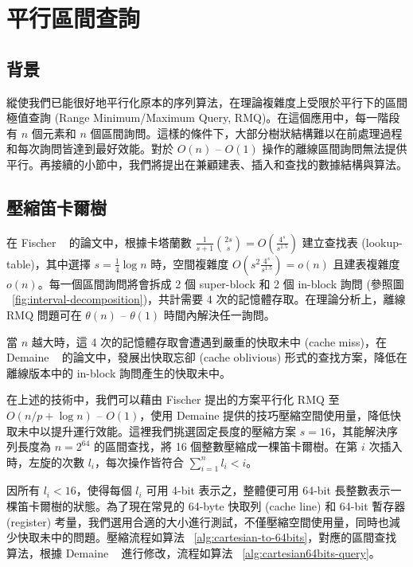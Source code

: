 \section{平行區間查詢}
\label{sec:parallelRMQ}

\subsection{背景}

縱使我們已能很好地平行化原本的序列算法，在理論複雜度上受限於平行下的區間極值查詢 (Range Minimum/Maximum Query, RMQ)。在這個應用中，每一階段有 $n$ 個元素和 $n$ 個區間詢問。這樣的條件下，大部分樹狀結構難以在前處理過程和每次詢問皆達到最好效能。對於 $O(n)$ -- $O(1)$ 操作的離線區間詢問無法提供平行。再接續的小節中，我們將提出在兼顧建表、插入和查找的數據結構與算法。

\subsection{壓縮笛卡爾樹}

在 Fischer ~\cite{fischer} 的論文中，根據卡塔蘭數 $\frac{1}{s+1}\binom{2s}{s} = O(\frac{4^s}{s^{1.5}})$ 建立查找表 (lookup-table)，其中選擇 $s = \frac{1}{4} \log n$ 時，空間複雜度 $O(s^2 \frac{4^s}{s^{1.5}}) = o(n)$ 且建表複雜度 $o(n)$。每一個區間詢問將會拆成 2 個 super-block 和 2 個 in-block 詢問 (參照圖 ~\ref{fig:interval-decomposition})，共計需要 4 次的記憶體存取。在理論分析上，離線 RMQ 問題可在 $\theta(n)$ -- $\theta(1)$ 時間內解決任一詢問。

當 $n$ 越大時，這 4 次的記憶體存取會遭遇到嚴重的快取未中 (cache miss)，在 Demaine ~\cite{demaine} 的論文中，發展出快取忘卻 (cache oblivious) 形式的查找方案，降低在離線版本中的 in-block 詢問產生的快取未中。

在上述的技術中，我們可以藉由 Fischer 提出的方案平行化 RMQ 至 $O(n / p + \log n)$ -- $O(1)$，使用 Demaine 提供的技巧壓縮空間使用量，降低快取未中以提升運行效能。這裡我們挑選固定長度的壓縮方案 $s = 16$，其能解決序列長度為 $n = 2^{64}$ 的區間查找，將 16 個整數壓縮成一棵笛卡爾樹。在第 $i$ 次插入時，左旋的次數 $l_i$，每次操作皆符合 $\sum_{i=1}^{n} l_i < i$。

因所有 $l_i < 16$，使得每個 $l_i$ 可用 4-bit 表示之，整體便可用 64-bit 長整數表示一棵笛卡爾樹的狀態。為了現在常見的 64-byte 快取列 (cache line) 和 64-bit 暫存器 (register) 考量，我們選用合適的大小進行測試，不僅壓縮空間使用量，同時也減少快取未中的問題。壓縮流程如算法 ~\ref{alg:cartesian-to-64bits}，對應的區間查找算法，根據 Demaine ~\cite{demaine} 進行修改，流程如算法 ~\ref{alg:cartesian64bits-query}。

